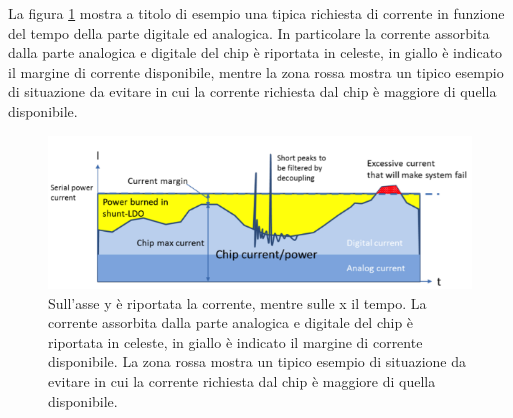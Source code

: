 La figura \ref{SLDOprinciple} mostra a titolo di esempio una tipica richiesta di corrente in funzione del tempo della parte digitale ed analogica.
In particolare la corrente assorbita dalla parte analogica e digitale del chip è riportata in celeste, in giallo è indicato il margine di corrente disponibile, mentre la zona rossa mostra un tipico esempio di situazione da evitare in cui la corrente richiesta dal chip è maggiore di quella disponibile.
\begin{figure}[!htbp]
\centering
\includegraphics[scale=.5]{Immagini/ShuntRegulatorPrinciple}
\caption{Sull'asse y è riportata la corrente, mentre sulle x il tempo. La corrente assorbita dalla parte analogica e digitale del chip è riportata in celeste, in giallo è indicato il margine di corrente disponibile. La zona rossa mostra un tipico esempio di situazione da evitare in cui la corrente richiesta dal chip è maggiore di quella disponibile.}
\label{SLDOprinciple}
\end{figure}

